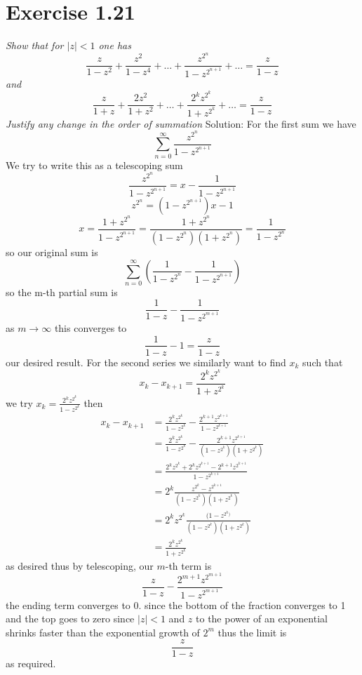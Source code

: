 \documentclass[11pt]{article}
\newcommand{\solution}[1]{{{\textcolor{header}{Solution:} \textcolor{solution}{#1}}}}
\begin{document}
\section{Exercise 1.21}
\emph{
    Show that for $|z| < 1$ one has
     \[
    \frac{z}{1-z^2} + \frac{z^2}{1-z^{4}} + \dots + \frac{z^{2^{n}}}{1-z^{2^{n+1}}} + \dots = \frac{z}{1-z}
    \] 
    and
    \[
    \frac{z}{1+z} + \frac{2z^2}{1+z^2} + \dots + \frac{2^{k}z^{2^{k}}}{1+z^{2^{k}}} + \dots = \frac{z}{1-z}
    \] 
    Justify any change in the order of summation
}
\solution{
    For the first sum we have
    \[
    \sum_{n=0}^{\infty}\frac{z^{2^{n}}}{1-z^{2^{n+1}}}
    \] 
    We try to write this as a telescoping sum
    \[
        \frac{z^{2^{n}}}{1-z^{2^{n+1}}} = x - \frac{1}{1-z^{2^{n+1}}}
    \] 
    \[
    z^{2^{n}} = (1-z^{2^{n+1}})x - 1
    \] 
    \[
    x = \frac{1+z^{2^{n}}}{1-z^{2^{n+1}}} = \frac{1+z^{2^{n}}}{(1-z^{2^{n}})(1+z^{2^{n}})} = \frac{1}{1-z^{2^{n}}}
    \] 
    so our original sum is
    \[
    \sum_{n=0}^{\infty}\left(\frac{1}{1-z^{2^{n}}} - \frac{1}{1-z^{2^{n+1}}}\right)
    \] 
    so the m-th partial sum is
    \[
        \frac{1}{1-z} - \frac{1}{1-z^{2^{m+1}}}
    \] 
    as $m \rightarrow \infty$ this converges to
    \[
    \frac{1}{1-z} - 1 = \frac{z}{1-z}
    \] 
    our desired result.
    For the second series we similarly want to find $x_k$ such that
     \[
         x_k - x_{k+1} = \frac{2^{k}z^{2^{k}}}{1+z^{2^{k}}}
    \] 
    we try $x_k = \frac{2^{k}z^{2^{k}}}{1-z^{2^{k}}}$
    then
    \begin{align*}
        x_k - x_{k+1} &= \frac{2^{k}z^{2^{k}}}{1-z^{2^{k}}} - \frac{2^{k+1}z^{2^{k+1}}}{1-z^{2^{k+1}}}\\
                      &= \frac{2^{k}z^{2^{k}}}{1-z^{2^{k}}} - \frac{2^{k+1}z^{2^{k+1}}}{(1-z^{2^{k}})(1+z^{2^{k}})}\\
                      &= \frac{2^{k}z^{2^{k}}+2^{k}z^{2^{k+1}} - 2^{k+1}z^{2^{k+1}}}{1-z^{2^{k+1}}}\\
                      &= 2^{k}\frac{z^{2^{k}} - z^{2^{k+1}}}{(1-z^{2^{k}})(1+z^{2^{k}})}\\
                      &= 2^{k}z^{2^{k}}\frac{(1-z^{2^{k})}}{(1-z^{2^{k}})(1+z^{2^{k}})}\\
                      &= \frac{2^{k}z^{2^{k}}}{1+z^{2^{k}}}
    \end{align*}
    as desired thus by telescoping, our  $m$-th term is
    \[
    \frac{z}{1-z} - \frac{2^{m+1}z^{2^{m+1}}}{1-z^{2^{m+1}}}
    \] 
    the ending term converges to 0. since the bottom of the fraction converges to 1 and the top goes to zero since $|z| < 1$  and $z$ to the power of an exponential shrinks faster than the exponential growth of  $2^{m}$
    thus the limit is
    \[
    \frac{z}{1-z}
    \] 
    as required.
}
\end{document}
